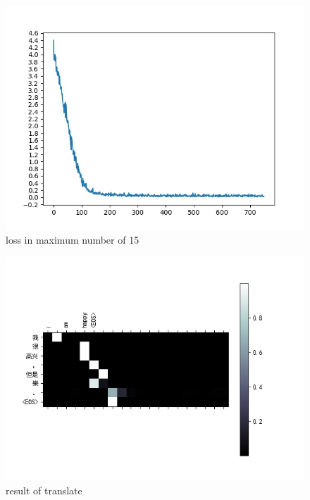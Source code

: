 \documentclass[journal, a4paper]{IEEEtran}
\begin{document}
		\begin{figure}
		\begin{center}
		\includegraphics[width=\columnwidth]{images/loss2.jpg}
		\caption{loss in maximum number of 15}
		\label{fig:loss2}
		\end{center}
	\end{figure}
	
		\begin{figure}
		\begin{center}
		\includegraphics[width=\columnwidth]{images/result-i am happy.jpg}
		\caption{result of translate}
		\label{fig:result1}
		\end{center}
	\end{figure}
	
\end{document}
